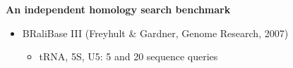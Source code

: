 \documentclass[landscape]{slides}
\begin{document}
\begin{slide}
\begin{center}
\large
\textbf{An independent homology search benchmark}
\end{center}
\medskip

\small
\begin{itemize}
\item
  BRaliBase III (Freyhult \& Gardner, Genome Research, 2007)
  \begin{itemize}
  \item
    tRNA, 5S, U5: 5 and 20 sequence queries
\end{itemize}
\end{itemize}

\vfill 
\end{slide}
\end{document}
